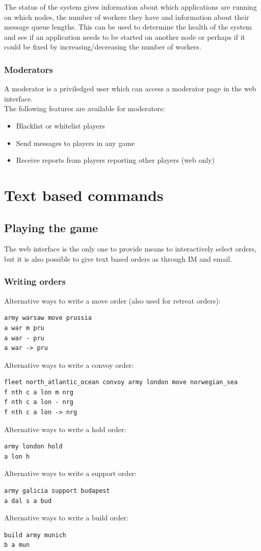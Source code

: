 \documentclass[11pt,a4paper]{report}
\begin{document}
The status of the system gives information about which applications are running
on which nodes, the number of workers they have and information about their
message queue lengths. This can be used to determine the health of the system
and see if an application needs to be started on another node or perhaps if it
could be fixed by increasing/decreasing the number of workers.

\subsection{Moderators}
A moderator is a priviledged user which can access a moderator page in the web
interface.\\

The following features are available for moderators:
\begin{itemize}
\item Blacklist or whitelist players
\item Send messages to players in any game
\item Receive reports from players reporting other players (web only)
\end{itemize}

\chapter{Text based commands}
\label{sec:textbasedcommands}

\section{Playing the game}
The web interface is the only one to provide means to interactively select
orders, but it is also possible to give text based orders as through IM and
email.\\

\subsection*{Writing orders}
Alternative ways to write a move order (also used for retreat orders):
\begin{verbatim}
army warsaw move prussia
a war m pru
a war - pru
a war -> pru
\end{verbatim}
Alternative ways to write a convoy order:
\begin{verbatim}
fleet north_atlantic_ocean convoy army london move norwegian_sea
f nth c a lon m nrg
f nth c a lon - nrg
f nth c a lon -> nrg
\end{verbatim}
Alternative ways to write a hold order:
\begin{verbatim}
army london hold
a lon h
\end{verbatim}
Alternative ways to write a support order:
\begin{verbatim}
army galicia support budapest
a dal s a bud
\end{verbatim}
Alternative ways to write a build order:
\begin{verbatim}
build army munich
b a mun
\end{verbatim}
\newpage
\end{document}
